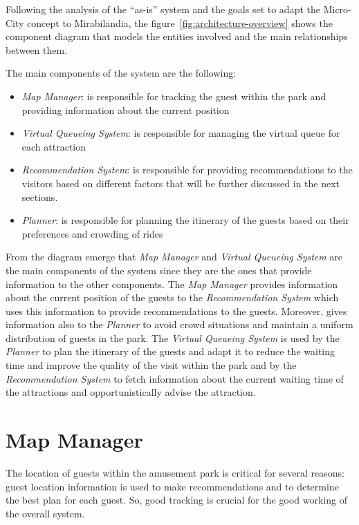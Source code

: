 Following the analysis of the ``as-is'' system and the goals set %
to adapt the Micro-City concept to Mirabilandia, the figure~\ref{fig:architecture-overview} shows the component diagram that models the entities involved and the main relationships between them.

The main components of the system are the following:

\begin{itemize}
	\item \textit{Map Manager}: is responsible for tracking the guest within the park and providing information about the current position
	\item \textit{Virtual Queueing System}: is responsible for managing the virtual queue for each attraction
	\item \textit{Recommendation System}: is responsible for providing recommendations to the visitors based on different factors that will be further discussed in the next sections.
	\item \textit{Planner}: is responsible for planning the itinerary of the guests based on their preferences and crowding of rides
\end{itemize}

From the diagram emerge that \textit{Map Manager} and \textit{Virtual Queueing System} are the main components of the system since they are the ones
that provide information to the other components. The \textit{Map Manager} provides information about the current position of the guests
to the \textit{Recommendation System} which uses this information to provide recommendations to the guests. Moreover, gives information also to the
\textit{Planner} to avoid crowd situations and maintain a uniform distribution of guests in the park. The \textit{Virtual Queueing System} is used by
the \textit{Planner} to plan the itinerary of the guests and adapt it to reduce the waiting time and improve the quality of the visit within the park
and by the \textit{Recommendation System} to fetch information about the current waiting time of the attractions and opportunistically advise the attraction.

\section{Map Manager}

The location of guests within the amusement park is critical for several reasons: guest location information is used to make recommendations and to determine the best plan for each guest. So, good tracking is crucial for the good working of the overall system.

